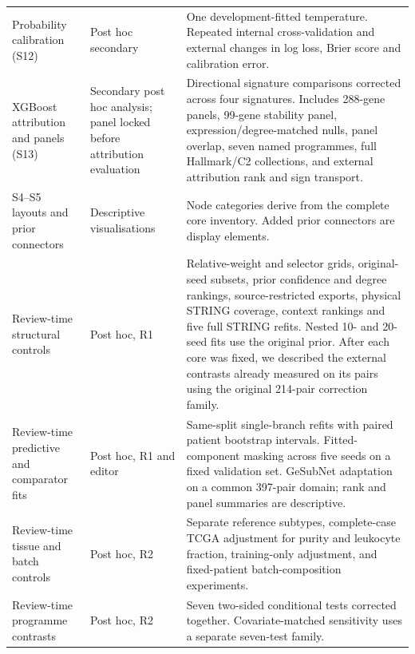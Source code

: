 \begin{longtable}{@{}p{.245\linewidth}p{.225\linewidth}p{.475\linewidth}@{}}
Probability calibration (S12) & Post hoc secondary & One development-fitted temperature. Repeated internal cross-validation and external changes in log loss, Brier score and calibration error.\\
XGBoost attribution and panels (S13) & Secondary post hoc analysis; panel locked before attribution evaluation & Directional signature comparisons corrected across four signatures. Includes 288-gene panels, 99-gene stability panel, expression/degree-matched nulls, panel overlap, seven named programmes, full Hallmark/C2 collections, and external attribution rank and sign transport.\\
S4--S5 layouts and prior connectors & Descriptive visualisations & Node categories derive from the complete core inventory. Added prior connectors are display elements.\\
Review-time structural controls & Post hoc, R1 & Relative-weight and selector grids, original-seed subsets, prior confidence and degree rankings, source-restricted exports, physical STRING coverage, context rankings and five full STRING refits. Nested 10- and 20-seed fits use the original prior. After each core was fixed, we described the external contrasts already measured on its pairs using the original 214-pair correction family.\\
Review-time predictive and comparator fits & Post hoc, R1 and editor & Same-split single-branch refits with paired patient bootstrap intervals. Fitted-component masking across five seeds on a fixed validation set. GeSubNet adaptation on a common 397-pair domain; rank and panel summaries are descriptive.\\
Review-time tissue and batch controls & Post hoc, R2 & Separate reference subtypes, complete-case TCGA adjustment for purity and leukocyte fraction, training-only adjustment, and fixed-patient batch-composition experiments.\\
Review-time programme contrasts & Post hoc, R2 & Seven two-sided conditional tests corrected together. Covariate-matched sensitivity uses a separate seven-test family.\\
\bottomrule
\end{longtable}
